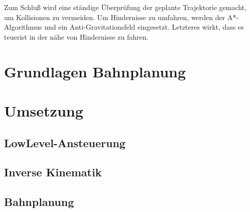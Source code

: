 Zum Schluß wird eine ständige Überprüfung der geplante Trajektorie gemacht, um Kollisionen zu vermeiden.
Um Hindernisse zu umfahren, werden der A*-Algorithmus und ein Anti-Gravitationsfeld eingesetzt.
Letzteres wirkt, dass es \glqq teuer\grqq \space ist in der nähe von Hindernisse zu fahren.



\section{Grundlagen Bahnplanung}
\label{bahnplanung_grundlagen_sec}
\authorsection{\editoroier}



\section{Umsetzung}
\label{bahnplanung_umsetzung_sec}


\subsection{LowLevel-Ansteuerung}
\label{bahnplanung_lowlevel_subsec}
\authorsection{\editoroier}



\subsection{Inverse Kinematik}
\label{inverse_kinematik_subsec}
\authorsection{\editorjulian}



\subsection{Bahnplanung}
\label{bahnplanung_subsec}
\authorsection{\editortobias}


